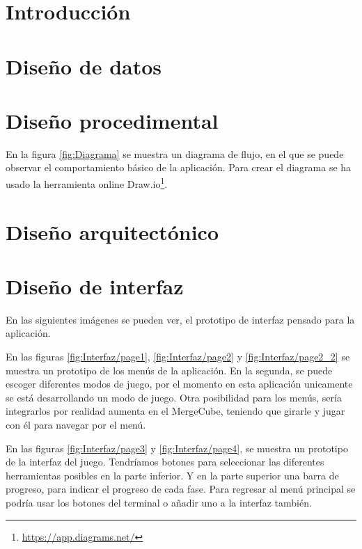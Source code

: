 
\section{Introducción}

\section{Diseño de datos}

\section{Diseño procedimental}
En la figura  \ref{fig:Diagrama} se muestra un diagrama de flujo, en el que se puede observar el comportamiento básico de la aplicación. Para crear el diagrama se ha usado la herramienta online Draw.io\footnote{\url{https://app.diagrams.net/}}.
\section{Diseño arquitectónico}
\section{Diseño de interfaz}

En las siguientes imágenes se pueden ver, el prototipo de interfaz pensado para la aplicación. 

En las figuras \ref{fig:Interfaz/page1}, \ref{fig:Interfaz/page2} y \ref{fig:Interfaz/page2_2} se muestra un prototipo de los menús de la aplicación. En la segunda, se puede escoger diferentes modos de juego, por el momento en esta aplicación unicamente se está desarrollando un modo de juego. 
Otra posibilidad para los menús, sería integrarlos por realidad aumenta en el MergeCube, teniendo que girarle y jugar con él para navegar por el menú.

En las figuras \ref{fig:Interfaz/page3} y \ref{fig:Interfaz/page4}, se muestra un prototipo de la interfaz del juego. Tendríamos botones para seleccionar las diferentes herramientas posibles en la parte inferior. Y en la parte superior una barra de progreso, para indicar el progreso de cada fase. Para regresar al menú principal se podría usar los botones del terminal o añadir uno a la interfaz también.

